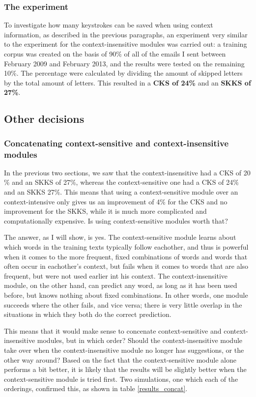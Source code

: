 \documentclass[12pt]{article}
\begin{document}
\subsubsection{The experiment}

To investigate how many keystrokes can be saved when using context information, as described in the previous paragraphs, an experiment very similar to the experiment for the context-insensitive modules was carried out: a training corpus was created on the basis of 90\% of all of the emails I sent between February 2009 and February 2013, and the results were tested on the remaining 10\%. The percentage were calculated by dividing the amount of skipped letters by the total amount of letters. This resulted in a \textbf{CKS of 24\%} and an \textbf{SKKS of 27\%}.

\subsection{Other decisions}

\subsubsection{Concatenating context-sensitive and context-insensitive modules} \label{concat}
In the previous two sections, we saw that the context-insensitive had a CKS of 20 \% and an SKKS of 27\%, whereas the context-sensitive one had a CKS of 24\% and an SKKS 27\%. This means that using a context-sensitive module over an context-intensive only gives us an improvement of 4\% for the CKS and no improvement for the SKKS, while it is much more complicated and computationally expensive. Is using context-sensitive modules worth that?

The answer, as I will show, is yes. The context-sensitive module learns about which words in the training texts typically follow eachother, and thus is powerful when it comes to the more frequent, fixed combinations of words and words that often occur in eachother's context, but fails when it comes to words that are also frequent, but were not used earlier int his context. The context-insensitive module, on the other hand, can predict any word, as long as it has been used before, but knows nothing about fixed combinations. In other words, one module succeeds where the other fails, and vice versa; there is very little overlap in the situations in which they both do the correct prediction. 

This means that it would make sense to concenate context-sensitive and context-insensitive modules, but in which order? Should the context-insensitive module take over when the context-insensitive module no longer has suggestions, or the other way around? Based on the fact that the context-sensitive module alone performs a bit better, it is likely that the results will be slightly better when the context-sensitive module is tried first. Two simulations, one which each of the orderings, confirmed this, as shown in table \ref{results_concat}.
\end{document}
